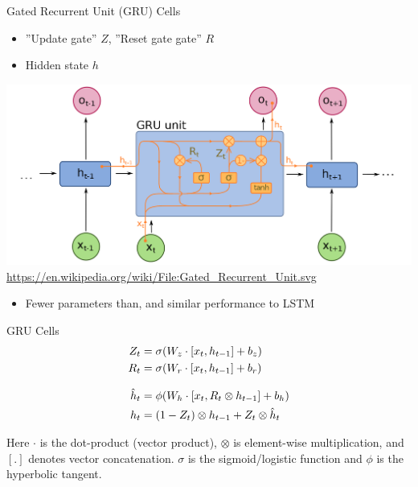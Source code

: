 \documentclass[ignorenonframetext,xcolor=x11names]{beamer}
\begin{document}
\begin{frame}{Gated Recurrent Unit (GRU) Cells}
\begin{itemize}
   \item ''Update gate'' $Z$, ''Reset gate gate'' $R$
   \item Hidden state $h$
\end{itemize}
\begin{center}
\includegraphics[width=.85\textwidth]{gru_wikimedia.png}
\scriptsize \url{https://en.wikipedia.org/wiki/File:Gated_Recurrent_Unit.svg} \normalsize
\end{center}
\begin{itemize}
   \item Fewer parameters than, and similar performance to LSTM
\end{itemize}
\end{frame}

\begin{frame}{GRU Cells}
\begin{align*}
Z_t &= \sigma (W_z \cdot [x_t, h_{t-1}] + b_z) \\
R_t &= \sigma (W_r \cdot [x_t, h_{t-1}] + b_r) \\[.5\baselineskip]
\hat{h}_t &= \phi (W_h \cdot [x_t, R_t \otimes h_{t-1}] + b_h) \\
h_t &= (1 - Z_t) \otimes h_{t-1} + Z_t \otimes \hat{h}_t
\end{align*}

\small
Here $\cdot$ is the dot-product (vector product), $\otimes$ is element-wise multiplication, and $[.]$ denotes vector concatenation.  $\sigma$ is the sigmoid/logistic function and $\phi$ is the hyperbolic tangent.
\end{frame}
\end{document}
